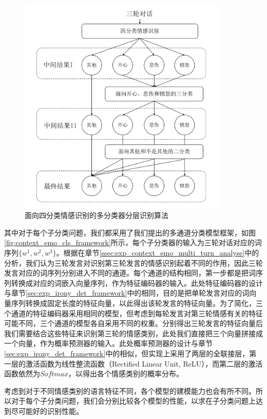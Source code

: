 \begin{figure}[H]
  \centering
  \includegraphics[width=0.9\textwidth]{img/context_emo_system.pdf}
  \caption{面向四分类情感识别的多分类器分层识别算法}
  \label{fig:context_emo_system}
\end{figure}

其中对于每个子分类问题，我们都采用了我们提出的多通道分类模型框架，如图\ref{fig:context_emo_cls_framework}所示，每个子分类器的输入为三轮对话对应的词序列$\{w^1, w^2, w^3\}$。根据在章节\ref{ssec:exp_context_emo_multi_turn_analyse}中的分析，我们认为三轮发言对识别第三轮发言的情感识别起着不同的作用，因此三轮发言对应的词序列分别进入不同的通道。每个通道的结构相同，第一步都是把词序列转换成对应的词嵌入向量序列，作为特征编码器的输入。此处特征编码器的设计与章节\ref{sec:exp_irony_det_framework}中的相同，目的是把单轮发言对应的词向量序列转换成固定长度的特征向量，以此得出该轮发言的特征向量。为了简化，三个通道的特征编码器采用相同的模型，但考虑到每轮发言对第三轮情感有关的特征可能不同，三个通道的模型各自采用不同的权重。分别得出三轮发言的特征向量后我们需要结合这些特征来识别第三轮的情感类别，此处我们直接把三个向量拼接成一个向量，作为概率预测器的输入。此处概率预测器的设计与章节\ref{sec:exp_irony_det_framework}中的相似，但实现上采用了两层的全联接层，第一层的激活函数为线性整流函数（Rectified Linear Unit, ReLU），而第二层的激活函数依然为$Softmax$，以得出各个情感类别的概率分布。

考虑到对于不同情感类别的语言特征不同，各个模型的建模能力也会有所不同。所以对于每个子分类问题，我们会分别比较各个模型的性能，以求在子分类问题上达到尽可能好的识别性能。

